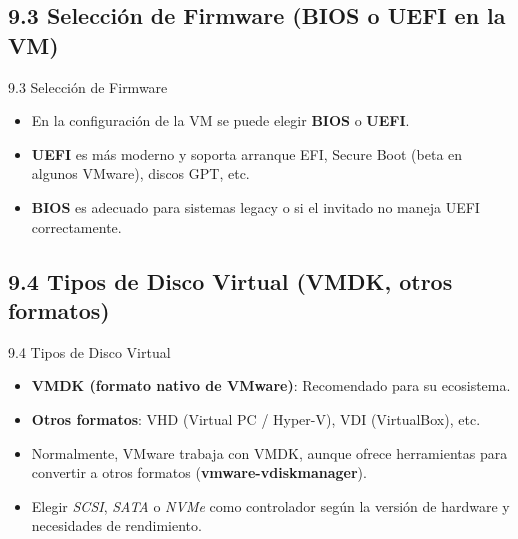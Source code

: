 \documentclass{beamer}
\begin{document}
\subsection{9.3 Selección de Firmware (BIOS o UEFI en la VM)}
\begin{frame}{9.3 Selección de Firmware}
	\begin{itemize}
		\item En la configuración de la VM se puede elegir \textbf{BIOS} o \textbf{UEFI}.
		\item \textbf{UEFI} es más moderno y soporta arranque EFI, Secure Boot (beta en algunos VMware), discos GPT, etc.
		\item \textbf{BIOS} es adecuado para sistemas legacy o si el invitado no maneja UEFI correctamente.
	\end{itemize}
\end{frame}

\subsection{9.4 Tipos de Disco Virtual (VMDK, otros formatos)}
\begin{frame}{9.4 Tipos de Disco Virtual}
	\begin{itemize}
		\item \textbf{VMDK (formato nativo de VMware)}: Recomendado para su ecosistema.
		\item \textbf{Otros formatos}: VHD (Virtual PC / Hyper-V), VDI (VirtualBox), etc.
		\item Normalmente, VMware trabaja con VMDK, aunque ofrece herramientas para convertir a otros formatos (\textbf{vmware-vdiskmanager}).
		\item Elegir \textit{SCSI}, \textit{SATA} o \textit{NVMe} como controlador según la versión de hardware y necesidades de rendimiento.
	\end{itemize}
\end{frame}

\end{document}
